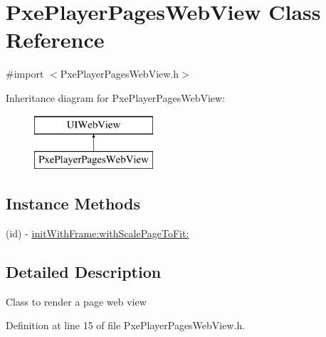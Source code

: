 \hypertarget{interface_pxe_player_pages_web_view}{\section{Pxe\-Player\-Pages\-Web\-View Class Reference}
\label{interface_pxe_player_pages_web_view}
}


{\ttfamily \#import $<$Pxe\-Player\-Pages\-Web\-View.\-h$>$}

Inheritance diagram for Pxe\-Player\-Pages\-Web\-View\-:\begin{figure}[H]
\begin{center}
\leavevmode
\includegraphics[height=2.000000cm]{interface_pxe_player_pages_web_view}
\end{center}
\end{figure}
\subsection*{Instance Methods}
\begin{DoxyCompactItemize}
\item 
(id) -\/ \hyperlink{interface_pxe_player_pages_web_view_a2432d7db13054d3dc7e3d20ab833d3ae}{init\-With\-Frame\-:with\-Scale\-Page\-To\-Fit\-:}
\end{DoxyCompactItemize}


\subsection{Detailed Description}
Class to render a page web view 

Definition at line 15 of file Pxe\-Player\-Pages\-Web\-View.\-h.



